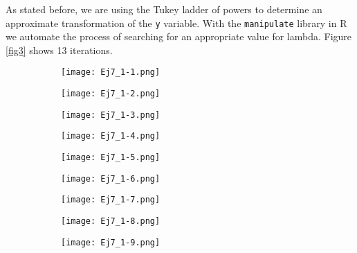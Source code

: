 \documentclass{article}
\begin{document}
As stated before, we are using the Tukey ladder of powers to determine an approximate transformation of the \texttt{y} variable. With the \texttt{manipulate} library in R we automate the process of searching for an appropriate value for lambda. Figure \ref{fig3} shows 13 iterations.\\

\begin{figure}[]
\begin{subfigure}{.23\textwidth}
  \centering
  \texttt{[image: Ej7\_1-1.png]}  
  \caption{ }
  \label{sb3-1}
\end{subfigure}
\begin{subfigure}{.23\textwidth}
  \centering
  \texttt{[image: Ej7\_1-2.png]}  
  \caption{ }
  \label{sb3-2}
\end{subfigure}
\begin{subfigure}{.23\textwidth}
  \centering
  \texttt{[image: Ej7\_1-3.png]}  
  \caption{ }
  \label{sb3-3}
\end{subfigure}
\begin{subfigure}{.23\textwidth}
  \centering
  \texttt{[image: Ej7\_1-4.png]}  
  \caption{ }
  \label{sb3-4}
\end{subfigure}
\newline
\begin{subfigure}{.23\textwidth}
  \centering
  \texttt{[image: Ej7\_1-5.png]}  
  \caption{ }
  \label{sb3-5}
\end{subfigure}
\begin{subfigure}{.23\textwidth}
  \centering
  \texttt{[image: Ej7\_1-6.png]}  
  \caption{ }
  \label{sb3-6}
\end{subfigure}
\begin{subfigure}{.23\textwidth}
  \centering
  \texttt{[image: Ej7\_1-7.png]}  
  \caption{ }
  \label{sb3-7}
\end{subfigure}
\begin{subfigure}{.23\textwidth}
  \centering
  \texttt{[image: Ej7\_1-8.png]}  
  \caption{ }
  \label{sb3-8}
\end{subfigure}
\newline
\begin{subfigure}{.23\textwidth}
  \centering
  \texttt{[image: Ej7\_1-9.png]}  
  \caption{ }
  \label{sb3-9}
\end{subfigure}
\begin{subfigure}{.23\textwidth}

\end{subfigure}
\end{figure}
\end{document}
